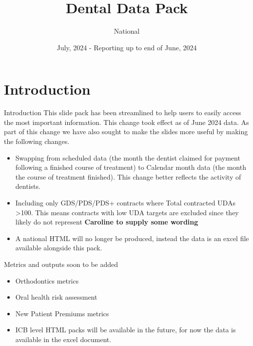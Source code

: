 \documentclass[
  8pt,
  ignorenonframetext,
  aspectratio = 169]{beamer}
\title{Dental Data Pack}
\subtitle{National}
\author{July, 2024 - Reporting up to end of June, 2024}
\date{}
\providecommand{\tightlist}{%
  \setlength{\itemsep}{0pt}\setlength{\parskip}{0pt}}
\begin{document}
\frame{\titlepage}

\begin{frame}[allowframebreaks]
  \tableofcontents[hideallsubsections]
\end{frame}
\hypertarget{introduction}{%
\section{Introduction}\label{introduction}}

\begin{frame}{Introduction}
\protect\hypertarget{introduction-1}{}
This slide pack has been streamlined to help users to easily access the
most important information. This change took effect as of June 2024
data. As part of this change we have also sought to make the slides more
useful by making the following changes.

\begin{itemize}
\tightlist
\item
  Swapping from scheduled data (the month the dentist claimed for
  payment following a finished course of treatment) to Calendar month
  data (the month the course of treatment finished). This change better
  reflects the activity of dentists.
\item
  Including only GDS/PDS/PDS+ contracts where Total contracted UDAs
  \textgreater100. This means contracts with low UDA targets are
  excluded since they likely do not represent \textbf{Caroline to supply
  some wording}
\item
  A national HTML will no longer be produced, instead the data is an
  excel file available alongside this pack.
\end{itemize}

\begin{block}{Metrics and outputs soon to be added}
\protect\hypertarget{metrics-and-outputs-soon-to-be-added}{}
\begin{itemize}
\tightlist
\item
  Orthodontics metrics
\item
  Oral health risk assessment
\item
  New Patient Premiums metrics
\item
  ICB level HTML packs will be available in the future, for now the data
  is available in the excel document.
\end{itemize}
\end{block}
\end{frame}
\end{document}
